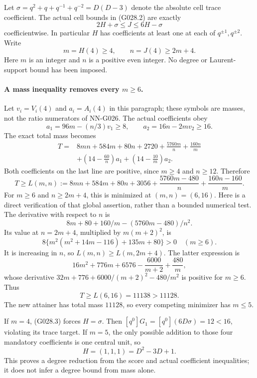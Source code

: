 Let $\sigma=q^2+q+q^{-1}+q^{-2}=D(D-3)$ denote
the absolute cell trace coefficient. The actual cell
bounds in (G028.2) are exactly
\[
 2H+\sigma\le J\le6H-\sigma                       \tag{G028.3}
\]
coefficientwise. In particular $H$ has coefficients
at least one at each of $q^{\pm1},q^{\pm2}$.
Write
\[
 m=H(4)\ge4,\qquad n=J(4)\ge2m+4.
\]
Here $m$ is an integer and $n$ is a positive even integer.
No degree or Laurent-support bound has been imposed.

\paragraph{A mass inequality removes every $m\ge6$.}
Let $v_i=V_i(4)$ and $a_i=A_i(4)$ in this paragraph;
these symbols are masses, not the ratio numerators of
NN-G026. The actual coefficients obey
\[
 a_1=96m-(n/3)v_1\ge8,\qquad
 a_2=16n-2mv_2\ge16.
\]
The exact total mass becomes
\[
 \begin{split}
 T={}&8mn+584m+80n+2720+
       \frac{5760m}{n}+\frac{160n}{m}\\
    &+\left(14-\frac{60}{n}\right)a_1
       +\left(14-\frac{10}{m}\right)a_2.
 \end{split}                                                        \tag{G028.4}
\]
Both coefficients on the last line are positive,
since $m\ge4$ and $n\ge12$. Therefore
\[
 T\ge L(m,n):=8mn+584m+80n+3056
       +\frac{5760m-480}{n}+\frac{160n-160}{m}.       \tag{G028.5}
\]
For $m\ge6$ and $n\ge2m+4$, this is minimized at
$(m,n)=(6,16)$. Here is a direct verification of that
global assertion, rather than a bounded numerical test.
The derivative with respect to $n$ is
\[
 8m+80+160/m-(5760m-480)/n^2.
\]
Its value at $n=2m+4$, multiplied by $m(m+2)^2$,
is
\[
 8\{m^2(m^2+14m-116)+135m+80\}>0
 \quad(m\ge6).
\]
It is increasing in $n$, so $L(m,n)\ge L(m,2m+4)$.
The latter expression is
\[
 16m^2+776m+6576-\frac{6000}{m+2}+\frac{480}{m},
\]
whose derivative
$32m+776+6000/(m+2)^2-480/m^2$ is positive for
$m\ge6$. Thus
\[
 T\ge L(6,16)=11138>11128.                          \tag{G028.6}
\]
The new attainer has total mass $11128$, so every
competing minimizer has $m\le5$.

If $m=4$, (G028.3) forces $H=\sigma$.
Then $[q^0]G_1=[q^0](6D\sigma)=12<16$, violating
its trace target. If $m=5$, the only possible addition
to those four mandatory coefficients is one central
unit, so
\[
 H=(1,1,1)=D^2-3D+1.                                \tag{G028.7}
\]
This proves a degree reduction from the score and
actual coefficient inequalities; it does not infer
a degree bound from mass alone.

